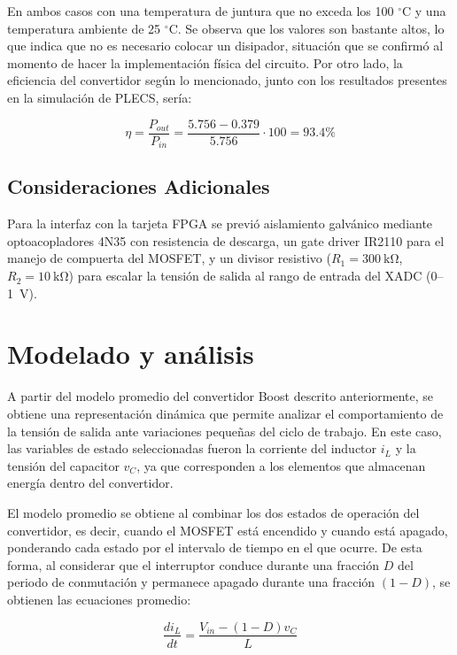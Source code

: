 \documentclass[conference]{IEEEtran}
\begin{document}
En ambos casos con una temperatura de juntura que no exceda los 100 $^\circ$C y una temperatura ambiente de 25 $^\circ$C. Se 
observa que los valores son bastante altos, lo que indica que no es necesario colocar un disipador, situación que se confirmó al momento
de hacer la implementación física del circuito. Por otro lado, la eficiencia del convertidor según lo mencionado, junto con los resultados
presentes en la simulación de PLECS, sería: 

\begin{equation}
    \eta = \frac{P_{out}}{P_{in}} = \frac{5.756 - 0.379}{5.756} \cdot 100 = 93.4\%
\end{equation}

\subsection{Consideraciones Adicionales}

Para la interfaz con la tarjeta FPGA se previó aislamiento 
galvánico mediante optoacopladores 4N35 con resistencia de descarga, 
un gate driver IR2110 para el manejo de compuerta del MOSFET, y un 
divisor resistivo ($R_1 = 300~\mathrm{k\Omega}$, $R_2 = 10~\mathrm{k\Omega}$) 
para escalar la tensión de salida al rango de entrada del XADC (0--1~V).

\section{Modelado y análisis}

A partir del modelo promedio del convertidor Boost descrito anteriormente, se obtiene una representación dinámica que permite analizar el comportamiento de la tensión de salida ante variaciones pequeñas del ciclo de trabajo. En este caso, las variables de estado seleccionadas fueron la corriente del inductor $i_L$ y la tensión del capacitor $v_C$, ya que corresponden a los elementos que almacenan energía dentro del convertidor.

El modelo promedio se obtiene al combinar los dos estados de operación del
convertidor, es decir, cuando el MOSFET está encendido y cuando está apagado, ponderando cada estado por el intervalo de tiempo en el que ocurre. De esta forma, al considerar que el interruptor conduce durante una fracción $D$ del periodo de conmutación y permanece apagado durante una fracción $(1-D)$, se obtienen las ecuaciones promedio:

\begin{equation}
    \frac{di_L}{dt} =
    \frac{V_{in} - (1-D)v_C}{L}
    \label{eq:boost_prom_il}
\end{equation}
\end{document}
